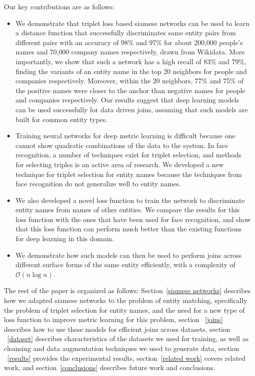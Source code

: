Our key contributions are as follows:
\begin{itemize}
\item We demonstrate that triplet loss based siamese networks can be used to learn a distance function that successfully discriminates same entity pairs from different pairs with an accuracy of 98\% and 97\% for about 200,000 people's names and 70,000 company names respectively, drawn from Wikidata.  More importantly, we show that such a network has a high recall of 83\% and 79\%, finding the variants of an entity name in the top 20 neighbors for people and companies respectively.  Moreover, within the 20 neighbors, 77\% and 75\% of the positive names were closer to the anchor than negative names for people and companies respectively.  Our results suggest that deep learning models can be used successfully for data driven joins, assuming that such models are built for common entity types.
\item Training neural networks for deep metric learning is difficult because one cannot show quadratic combinations of the data to the system.  In face recognition, a number of techniques exist for triplet selection, and methods for selecting triples is an active area of research.  We developed a new technique for triplet selection for entity names because the techniques from face recognition do not generalize well to entity names.
\item We also developed a novel loss function to train the network to discriminate entity names from names of other entities.  We compare the results for this loss function with the ones that have been used for face recognition, and show that this loss function can perform much better than the existing functions for deep learning in this domain.
\item We demonstrate how such models can then be used to perform joins across different surface forms of the same entity efficiently, with a complexity of $\mathcal{O}(n\log{}n)$.  
\end{itemize} 

The rest of the paper is organized as follows: Section~\ref{siamese networks} describes how we adapted siamese networks to the problem of entity matching, specifically the problem of triplet selection for entity names, and the need for a new type of loss function to improve metric learning for this problem, section ~\ref{joins} describes how to use these models for efficient joins across datasets, section ~\ref{dataset} describes characteristics of the datasets we used for training, as well as cleansing and data augmentation techniques we used to generate data, section ~\ref{results} provides the experimental results, section~\ref{related work} covers related work, and section~\ref{conclusions} describes future work and conclusions.

